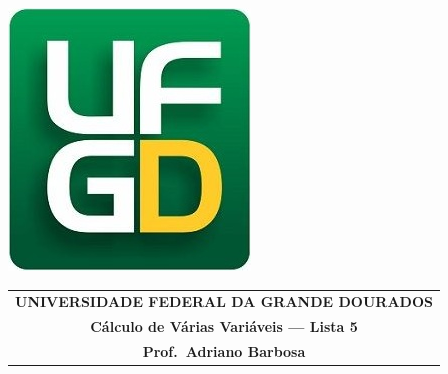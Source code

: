 \documentclass[a4paper,5pt]{amsbook}
\begin{document}
\thispagestyle{empty}
\pagestyle{empty}
\begin{minipage}[h]{0.14\textwidth}
	\includegraphics[scale=0.24]{../../ufgd.png}
\end{minipage}
\begin{minipage}[h]{\textwidth}
\begin{tabular}{c}
{{\bf UNIVERSIDADE FEDERAL DA GRANDE DOURADOS}}\\
{{\bf C\'alculo de V\'arias Vari\'aveis --- Lista 5}}\\
{{\bf Prof.\ Adriano Barbosa}}\\
\end{tabular}
\vspace{-0.45cm}
%
\end{minipage}

\end{document}
